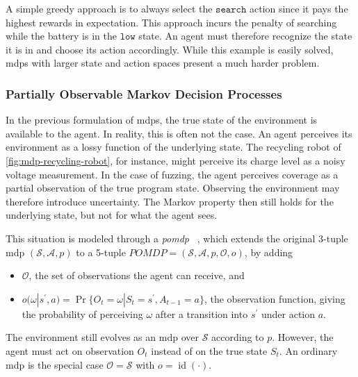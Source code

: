 

A simple greedy approach is to always select the $\mathtt{search}$ action since it
pays the highest rewards in expectation.
This approach incurs the penalty of searching while the battery is in the $\mathtt{low}$ state.
An agent must therefore recognize the state it is in and choose its action accordingly.
While this example is easily solved, \glspl{mdp} with larger state and action spaces present
a much harder problem.

\subsubsection{Partially Observable Markov Decision Processes}\label{sec:rl-pomdp}

In the previous formulation of \glspl{mdp}, the true state of the environment is available
to the agent.
In reality, this is often not the case.
An agent perceives its environment as a lossy function of the underlying state.
The recycling robot of \cref{fig:mdp-recycling-robot}, for instance, might perceive
its charge level as a noisy voltage measurement.
In the case of fuzzing, the agent perceives coverage as a partial observation of
the true program state.
Observing the environment may therefore introduce uncertainty.
The Markov property then still holds for the underlying state, but not for what the agent sees.

This situation is modeled through a \emph{\gls{pomdp}}%
~\cite{ASTROM1965174,kaelbling_planning_1998}, which
extends the original 3-tuple \gls{mdp} $(\mathcal{S},\mathcal{A},p)$ to a 5-tuple $\mathit{POMDP}=(\mathcal{S},\mathcal{A},p,\mathcal{O},o)$, by adding

\begin{itemize}
  \item $\mathcal{O}$, the set of observations the agent can receive, and
  \item $o(\omega|s^\prime,a)=\Pr\{O_t=\omega|S_t=s^\prime,A_{t-1}=a\}$, the observation
    function, giving the probability of perceiving $\omega$ after a transition into
    $s^\prime$ under action $a$.
\end{itemize}

The environment still evolves as an \gls{mdp} over $\mathcal{S}$ according to $p$.
However, the agent must act on observation $O_t$ instead of on the true state $S_t$.
An ordinary \gls{mdp} is the special case $\mathcal{O}=\mathcal{S}$ with $o=\operatorname{id}(\cdot)$.

